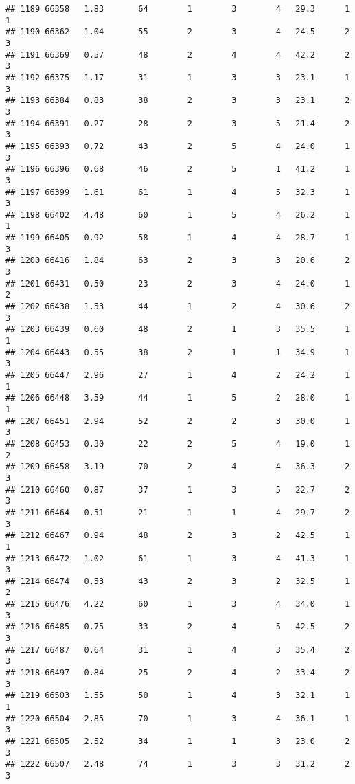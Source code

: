 \documentclass[
]{article}
\begin{document}
\begin{verbatim}
## 1189 66358   1.83       64        1        3        4   29.3      1      1
## 1190 66362   1.04       55        2        3        4   24.5      2      3
## 1191 66369   0.57       48        2        4        4   42.2      2      3
## 1192 66375   1.17       31        1        3        3   23.1      1      3
## 1193 66384   0.83       38        2        3        3   23.1      2      3
## 1194 66391   0.27       28        2        3        5   21.4      2      3
## 1195 66393   0.72       43        2        5        4   24.0      1      3
## 1196 66396   0.68       46        2        5        1   41.2      1      3
## 1197 66399   1.61       61        1        4        5   32.3      1      3
## 1198 66402   4.48       60        1        5        4   26.2      1      1
## 1199 66405   0.92       58        1        4        4   28.7      1      3
## 1200 66416   1.84       63        2        3        3   20.6      2      3
## 1201 66431   0.50       23        2        3        4   24.0      1      2
## 1202 66438   1.53       44        1        2        4   30.6      2      3
## 1203 66439   0.60       48        2        1        3   35.5      1      1
## 1204 66443   0.55       38        2        1        1   34.9      1      3
## 1205 66447   2.96       27        1        4        2   24.2      1      1
## 1206 66448   3.59       44        1        5        2   28.0      1      1
## 1207 66451   2.94       52        2        2        3   30.0      1      3
## 1208 66453   0.30       22        2        5        4   19.0      1      2
## 1209 66458   3.19       70        2        4        4   36.3      2      3
## 1210 66460   0.87       37        1        3        5   22.7      2      3
## 1211 66464   0.51       21        1        1        4   29.7      2      3
## 1212 66467   0.94       48        2        3        2   42.5      1      1
## 1213 66472   1.02       61        1        3        4   41.3      1      3
## 1214 66474   0.53       43        2        3        2   32.5      1      2
## 1215 66476   4.22       60        1        3        4   34.0      1      3
## 1216 66485   0.75       33        2        4        5   42.5      2      3
## 1217 66487   0.64       31        1        4        3   35.4      2      3
## 1218 66497   0.84       25        2        4        2   33.4      2      3
## 1219 66503   1.55       50        1        4        3   32.1      1      1
## 1220 66504   2.85       70        1        3        4   36.1      1      3
## 1221 66505   2.52       34        1        1        3   23.0      2      3
## 1222 66507   2.48       74        1        3        3   31.2      2      3

\end{verbatim}
\end{document}
